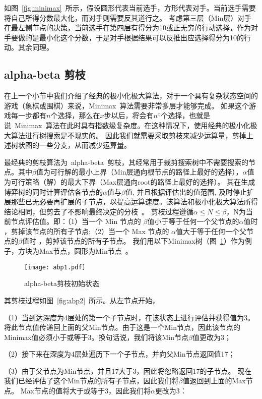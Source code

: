 如图~\ref{fig:minimax}~所示，假设圆形代表当前选手，方形代表对手。当前选手需要将自己所得分数最大化，而对手则需要反其道行之。
考虑第三层（Min层）对手在最左侧节点的决策，当前选手在第四层有得分为10或正无穷的行动选择，作为对手要做的是最小化这个分数，于是对手根据结果可以反推出应选择得分为10的行动。其余同理。
\subsection{alpha-beta 剪枝}
在上一个小节中我们介绍了经典的极小化极大算法，对于一个具有复杂状态空间的游戏（象棋或围棋）来说，Minimax~算法需要非常多层才能够完成。
如果这个游戏每一步都有$n$个选择，那么在$x$步以后，将会有$n^x$个选择，也就是说~Minimax~算法在此时具有指数级复杂度。在这种情况下，使用经典的极小化极大算法进行树搜索是不现实的。
因此我们就需要采取剪枝来减少运算量，剪掉上述树状图的一些分支，从而减少运算量。

最经典的剪枝算法为~alpha-beta~剪枝，其经常用于裁剪搜索树中不需要搜索的节点。其中$\beta$值为可行解的最小上界（Min层通向根节点的路径上最好的选择），$\alpha$值为可行策略（解）的最大下界（Max层通向root的路径上最好的选择）。
其在生成博弈树的同时计算评估各节点的$\alpha$值与$\beta$值, 并且根据评估出的值范围, 及时停止扩展那些已无必要再扩展的子节点，以提高运算速度。该算法和极小化极大算法所得结论相同，但剪去了不影响最终决定的分枝~\cite{russell2010artificial}。
剪枝过程遵循$\alpha \le N \le \beta$，N为当前节点评估值。即：（1）当一个 Min 节点的 $\beta$值小于等于任何一个父节点的$\alpha$值时 ，剪掉该节点的所有子节点;（2）当一个 Max 节点的 $\alpha$值大于等于任何一个父节点的$\beta$值时 ，剪掉该节点的所有子节点。
我们用以下Minimax树（图~\ref{fig:abp}）作为例子，方块为Max节点，圆形为Min节点~\cite{russell2010artificial}。
\begin{figure}[htb]
    \centering
    \texttt{[image: abp1.pdf]}
    \caption[abp]{%
    alpha-beta剪枝初始状态~\cite{russell2010artificial}%
      }
    \label{fig:abp}
  \end{figure}

其剪枝过程如图~\ref{fig:abp2}~所示。从左节点开始，

（1）当到达深度为4层处的第一个子节点时，在该状态上进行评估并获得值为3。将此节点值传递回上面的父Min节点。由于这是一个Min节点，因此该节点的Minimax值必须小于或等于3。换句话说，我们将该Min节点$\beta$值更改为3；

（2）接下来在深度为4层处遍历下一个子节点，并向父Min节点返回值17；

（3）由于父节点为Min节点，并且17大于3，因此将忽略返回17的子节点。 现在我们已经评估了这个Min节点的所有子节点，因此我们将$\beta$值返回到上面的Max节点。 Max节点的值将大于或等于3，因此我们将$\alpha$更改为3：

